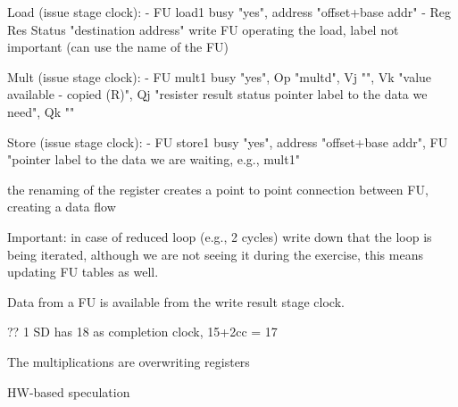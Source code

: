 Load (issue stage clock):
- FU load1 busy "yes", address "offset+base addr"
- Reg Res Status "destination address" write FU operating the load, label not important (can use the name of the FU)

Mult (issue stage clock):
- FU mult1 busy "yes", Op "multd", Vj "", Vk "value available - copied (R)", Qj "resister result status pointer label to the data we need", Qk ""

Store (issue stage clock):
- FU store1 busy "yes", address "offset+base addr", FU "pointer label to the data we are waiting, e.g., mult1"

the renaming of the register creates a point to point connection between FU, creating a data flow

Important: in case of reduced loop (e.g., 2 cycles) write down that the loop is being iterated, although we are not seeing it during the exercise,
this means updating FU tables as well.

Data from a FU is available from the write result stage clock.

?? 1 SD has 18 as completion clock, 15+2cc = 17

The multiplications are overwriting registers



HW-based speculation